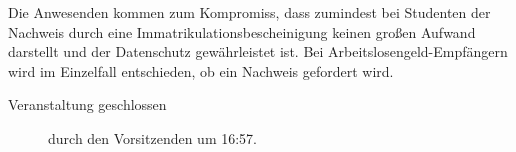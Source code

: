 \documentclass[a4paper,12pt]{scrartcl}
\begin{document}
Die Anwesenden kommen zum Kompromiss, dass zumindest bei Studenten der Nachweis 
durch eine Immatrikulationsbescheinigung keinen großen Aufwand darstellt und 
der Datenschutz gewährleistet ist. Bei Arbeitslosengeld-Empfängern wird im 
Einzelfall entschieden, ob ein Nachweis gefordert wird.


\begin{description}
\item[Veranstaltung geschlossen] durch den Vorsitzenden um 16:57.
\end{description}
\end{document}

